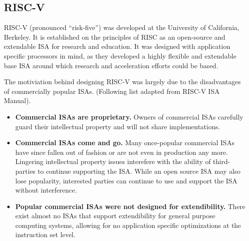 \subsection{RISC-V}

    \glsdesc{RISC-V} (pronounced ``risk-five'') was developed at the University of California, Berkeley. It is established on the principles of RISC as an open-source and extendable \gls{ISA} for research and education. It was designed with application specific processors in mind, as they developed a highly flexible and extendable base \gls{ISA} around which research and acceleration efforts could be based.

    The motiviation behind designing RISC-V was largely due to the disadvantages of commercially popular \glspl{ISA}.\cite{Isa2012} (Following list adapted from RISC-V ISA Manual).
    \begin{itemize}
    \item \textbf{Commercial ISAs are proprietary.} Owners of commercial ISAs carefully guard their intellectual property and will not share implementations. 
    \item \textbf{Commercial ISAs come and go.} Many once-popular commercial ISAs have since fallen out of fashion or are not even in production any more. Lingering intellectual property issues interefere with the ability of third-parties to continue supporting the ISA. While an open source \gls{ISA} may also lose popularity, interested parties can continue to use and support the ISA without interference.
    \item \textbf{Popular commercial ISAs were not designed for extendibility.} There exist almost no ISAs that support extendibility for general purpose computing systems, allowing for no application specific optimizations at the instruction set level.
    \end{itemize}

    
